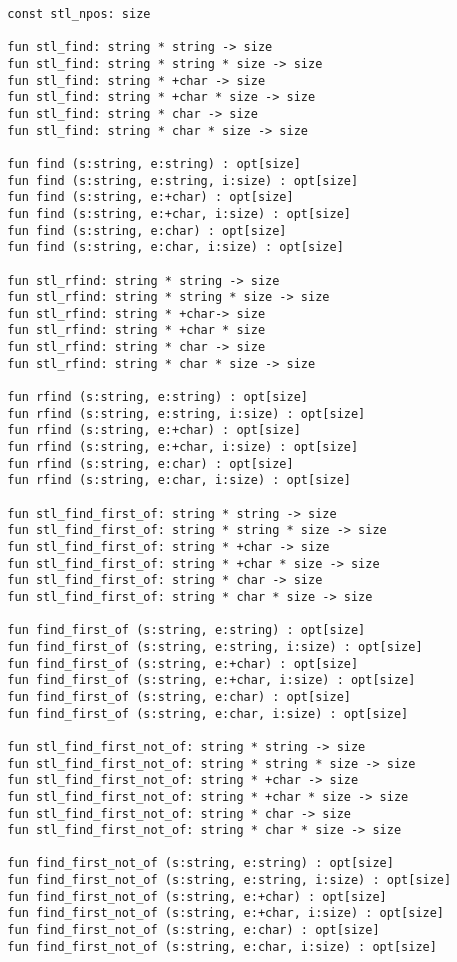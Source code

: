 \documentclass[oneside]{book}
\begin{document}
\begin{verbatim}
  const stl_npos: size

  fun stl_find: string * string -> size
  fun stl_find: string * string * size -> size
  fun stl_find: string * +char -> size
  fun stl_find: string * +char * size -> size
  fun stl_find: string * char -> size
  fun stl_find: string * char * size -> size

  fun find (s:string, e:string) : opt[size] 
  fun find (s:string, e:string, i:size) : opt[size]
  fun find (s:string, e:+char) : opt[size]
  fun find (s:string, e:+char, i:size) : opt[size]
  fun find (s:string, e:char) : opt[size]
  fun find (s:string, e:char, i:size) : opt[size]

  fun stl_rfind: string * string -> size
  fun stl_rfind: string * string * size -> size
  fun stl_rfind: string * +char-> size
  fun stl_rfind: string * +char * size
  fun stl_rfind: string * char -> size
  fun stl_rfind: string * char * size -> size

  fun rfind (s:string, e:string) : opt[size]
  fun rfind (s:string, e:string, i:size) : opt[size]
  fun rfind (s:string, e:+char) : opt[size]
  fun rfind (s:string, e:+char, i:size) : opt[size]
  fun rfind (s:string, e:char) : opt[size]
  fun rfind (s:string, e:char, i:size) : opt[size]

  fun stl_find_first_of: string * string -> size
  fun stl_find_first_of: string * string * size -> size
  fun stl_find_first_of: string * +char -> size
  fun stl_find_first_of: string * +char * size -> size
  fun stl_find_first_of: string * char -> size
  fun stl_find_first_of: string * char * size -> size

  fun find_first_of (s:string, e:string) : opt[size]
  fun find_first_of (s:string, e:string, i:size) : opt[size]
  fun find_first_of (s:string, e:+char) : opt[size]
  fun find_first_of (s:string, e:+char, i:size) : opt[size]
  fun find_first_of (s:string, e:char) : opt[size]
  fun find_first_of (s:string, e:char, i:size) : opt[size]

  fun stl_find_first_not_of: string * string -> size
  fun stl_find_first_not_of: string * string * size -> size
  fun stl_find_first_not_of: string * +char -> size
  fun stl_find_first_not_of: string * +char * size -> size
  fun stl_find_first_not_of: string * char -> size
  fun stl_find_first_not_of: string * char * size -> size

  fun find_first_not_of (s:string, e:string) : opt[size]
  fun find_first_not_of (s:string, e:string, i:size) : opt[size]
  fun find_first_not_of (s:string, e:+char) : opt[size]
  fun find_first_not_of (s:string, e:+char, i:size) : opt[size]
  fun find_first_not_of (s:string, e:char) : opt[size]
  fun find_first_not_of (s:string, e:char, i:size) : opt[size]


\end{verbatim}
\end{document}
